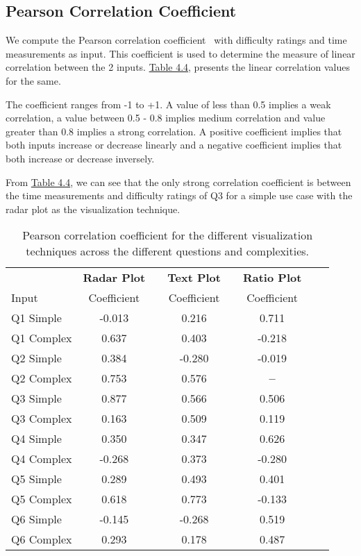 \subsection{Pearson Correlation Coefficient}
We compute the Pearson correlation coefficient~\cite{pearson1896vii} with difficulty ratings and time measurements as input. This coefficient is used to determine the measure of linear correlation between the 2 inputs. \hyperref[table:pearons]{Table 4.4}, presents the linear correlation values for the same.

The coefficient ranges from -1 to +1. A value of less than 0.5 implies a weak correlation, a value between 0.5 - 0.8 implies medium correlation and value greater than 0.8 implies a strong correlation. A positive coefficient implies that both inputs increase or decrease linearly and a negative coefficient implies that both increase or decrease inversely.

From \hyperref[table:pearons]{Table 4.4}, we can see that the only strong correlation coefficient is between the time measurements and difficulty ratings of Q3 for a simple use case with the radar plot as the visualization technique.

\begin{table}[!htbp]
\centering
\begin{tabular}{@{\extracolsep{4pt}}lccccccc}
\toprule   
{} & \textbf{Radar Plot} &   &   \textbf{Text Plot} &   &  \textbf{Ratio Plot}\\
 \cmidrule{2-3} 
 \cmidrule{4-5} 
  \cmidrule{6-7} 
Input  & Coefficient &  & Coefficient &  & Coefficient \\
\midrule
Q1 Simple  & -0.013 &  & 0.216 &  & 0.711 & \\ 
Q1 Complex & 0.637 &  & 0.403 &  & -0.218 & \\ 
Q2 Simple  & 0.384 &  & -0.280 &  & -0.019 & \\ 
Q2 Complex & 0.753 &  & 0.576 &  & \textbf{--} & \\ 
Q3 Simple  & 0.877 &  & 0.566 &  & 0.506 & \\ 
Q3 Complex & 0.163 &  & 0.509 &  & 0.119 & \\ 
Q4 Simple  & 0.350 &  & 0.347 &  & 0.626 &\\ 
Q4 Complex & -0.268 &  & 0.373 &  & -0.280 &\\ 
Q5 Simple  & 0.289 &  & 0.493 &  & 0.401 &\\ 
Q5 Complex & 0.618 &  & 0.773 &  & -0.133 &\\ 
Q6 Simple  & -0.145 &  & -0.268  &  & 0.519 &\\ 
Q6 Complex & 0.293 &  & 0.178  &  & 0.487 &\\ 
\bottomrule
\end{tabular}
\label{table:pearons}
\caption[Pearson correlation coefficient]{Pearson correlation coefficient for the different visualization techniques across the different questions and complexities.} 
\end{table}

